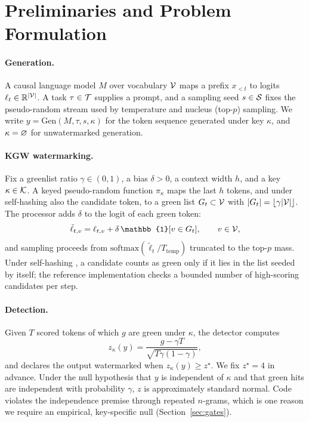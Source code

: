 \section{Preliminaries and Problem Formulation}
\label{sec:prelim}

\paragraph{Generation.} A causal language model $M$ over vocabulary $\mathcal{V}$ maps a prefix $x_{<t}$ to logits $\ell_t\in\mathbb{R}^{|\mathcal{V}|}$. A task $\tau\in\mathcal{T}$ supplies a prompt, and a sampling seed $s\in\mathcal{S}$ fixes the pseudo-random stream used by temperature and nucleus (top-$p$) sampling. We write $y=\mathrm{Gen}(M,\tau,s,\kappa)$ for the token sequence generated under key $\kappa$, and $\kappa=\varnothing$ for unwatermarked generation.

\paragraph{KGW watermarking.} Fix a greenlist ratio $\gamma\in(0,1)$, a bias $\delta>0$, a context width $h$, and a key $\kappa\in\mathcal{K}$. A keyed pseudo-random function $\pi_\kappa$ maps the last $h$ tokens, and under self-hashing also the candidate token, to a green list $G_t\subset\mathcal{V}$ with $|G_t|=\lfloor\gamma|\mathcal{V}|\rfloor$. The processor adds $\delta$ to the logit of each green token:
\begin{equation}
\tilde\ell_{t,v}=\ell_{t,v}+\delta\,\mathbb{1}[v\in\G_t],\qquad v\in\V,
\label{eq:kgw}
\end{equation}
and sampling proceeds from $\mathrm{softmax}(\tilde\ell_t/T_{\mathrm{temp}})$ truncated to the top-$p$ mass. Under self-hashing \citep{kirchenbauer2024reliability}, a candidate counts as green only if it lies in the list seeded by itself; the reference implementation checks a bounded number of high-scoring candidates per step.

\paragraph{Detection.} Given $T$ scored tokens of which $g$ are green under $\kappa$, the detector computes
\begin{equation}
z_\kappa(y)=\frac{g-\gamma T}{\sqrt{T\gamma(1-\gamma)}},
\label{eq:z}
\end{equation}
and declares the output watermarked when $z_\kappa(y)\ge z^\star$. We fix $z^\star=4$ in advance. Under the null hypothesis that $y$ is independent of $\kappa$ and that green hits are independent with probability $\gamma$, $z$ is approximately standard normal. Code violates the independence premise through repeated $n$-grams, which is one reason we require an empirical, key-specific null (Section~\ref{sec:gates}).

